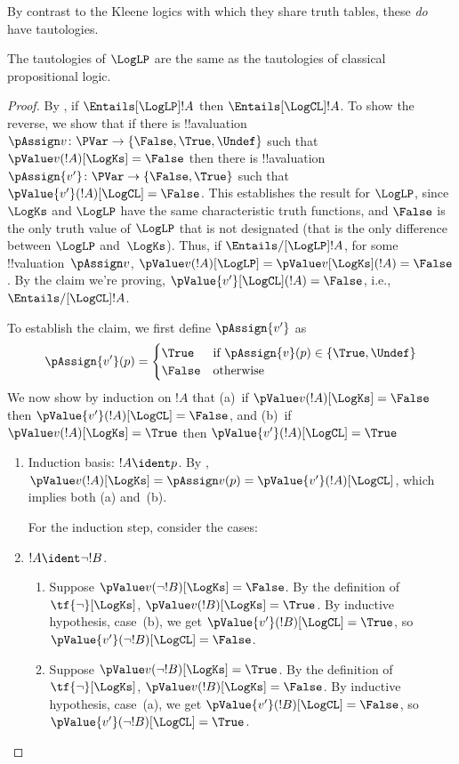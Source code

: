 \documentclass[../../../include/open-logic-section]{subfiles}
\begin{document}
By contrast to the Kleene logics with which they share truth tables,
these \emph{do} have tautologies. 

\begin{prop} The tautologies of $\LogLP$  are
  the same as the tautologies of classical propositional logic.
\end{prop}

\begin{proof}
  By , if $\Entails[\LogLP] !A$ then
  $\Entails[\LogCL] !A$. To show the reverse, we show that if there is
  !!a{valuation}~$\pAssign v\colon \PVar \to \{\False, \True,
  \Undef\}$ such that $\pValue v(!A)[\LogKs] = \False$ then there is
  !!a{valuation}~$\pAssign {v'}\colon \PVar \to \{\False, \True\}$
  such that $\pValue {v'}(!A)[\LogCL] = \False$. This establishes the
  result for $\LogLP$, since $\LogKs$ and $\LogLP$ have the same
  characteristic truth functions, and $\False$ is the only truth value
  of $\LogLP$ that is not designated (that is the only difference
  between $\LogLP$ and~$\LogKs$). Thus, if $\Entails/[\LogLP] !A$, for
  some !!{valuation}~$\pAssign v$, $\pValue v(!A)[\LogLP] = \pValue
  v[\LogKs](!A) = \False$. By the claim we're proving,
  $\pValue{v'}[\LogCL](!A) = \False$, i.e., $\Entails/[\LogCL] !A$.
  
  To establish the claim, we first define $\pAssign {v'}$ as
  \[
    \pAssign {v'}(p) = 
    \begin{cases}
    \True & \text{if } \pAssign {v}(p) \in \{\True, \Undef\}\\
    \False & \text{otherwise}
  \end{cases}
  \]
  We now show by induction on $!A$ that (a)~if $\pValue v(!A)[\LogKs]
  = \False$ then $\pValue {v'}(!A)[\LogCL] = \False$, and (b)~if
  $\pValue v(!A)[\LogKs] = \True$ then $\pValue {v'}(!A)[\LogCL] =
  \True$
  \begin{enumerate}
    \item Induction basis: $!A \ident p$. By
    , $\pValue v(!A)[\LogKs]
    = \pAssign v(p) = \pValue {v'}(!A)[\LogCL]$, which implies both (a)
    and~(b).
    
    For the induction step, consider the cases:
    \item $!A \ident \lnot !B$. 
    \begin{enumerate}
      \item Suppose $\pValue v(\lnot!B)[\LogKs] = \False$. By the
      definition of $\tf{\lnot}[\LogKs]$, $\pValue v(!B)[\LogKs]  =
      \True$. By inductive hypothesis, case~(b), we get $\pValue
      {v'}(!B)[\LogCL]  = \True$, so $\pValue {v'}(\lnot !B)[\LogCL] = \False$.
      \item Suppose $\pValue v(\lnot!B)[\LogKs] = \True$. By the
      definition of $\tf{\lnot}[\LogKs]$, $\pValue v(!B)[\LogKs]  =
      \False$. By inductive hypothesis, case~(a), we get $\pValue
      {v'}(!B)[\LogCL]  = \False$, so $\pValue {v'}(\lnot !B)[\LogCL] = \True$.
    \end{enumerate}


\end{enumerate}
\end{proof}
\end{document}
